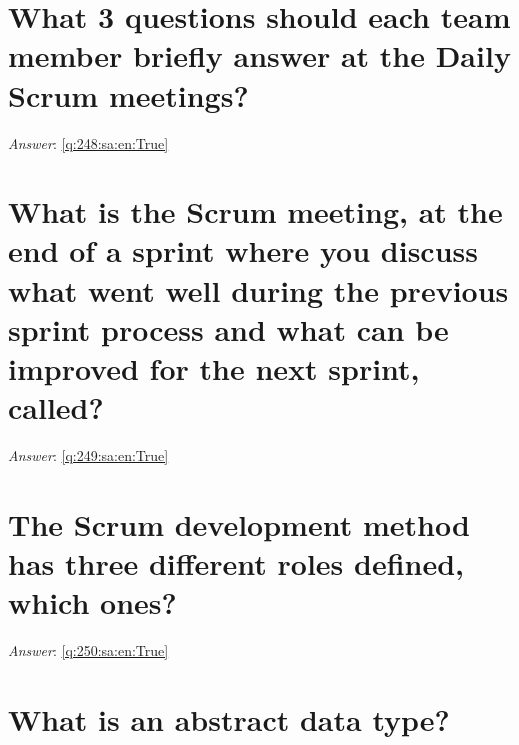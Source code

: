 \documentclass[a4paper,11pt,oneside]{book}
\begin{document}
\begin{sloppypar}
\section{What 3 questions should each team member briefly answer at the Daily Scrum meetings?}

\label{q:248:sa:en:False}

\vspace{2cm}

\noindent\makebox[\textwidth]{\hrulefill}

\vspace{1cm}

\textit{Answer}: \autoref{q:248:sa:en:True}



\section{What is the Scrum meeting, at the end of a sprint where you discuss what went well during the previous sprint process and what can be improved for the next sprint, called?}

\label{q:249:sa:en:False}

\vspace{2cm}

\noindent\makebox[\textwidth]{\hrulefill}

\vspace{1cm}

\textit{Answer}: \autoref{q:249:sa:en:True}



\section{The Scrum development method has three different roles defined, which ones?}

\label{q:250:sa:en:False}

\vspace{2cm}

\noindent\makebox[\textwidth]{\hrulefill}

\vspace{1cm}

\textit{Answer}: \autoref{q:250:sa:en:True}



\section{What is an abstract data type?}


\end{sloppypar}
\end{document}
